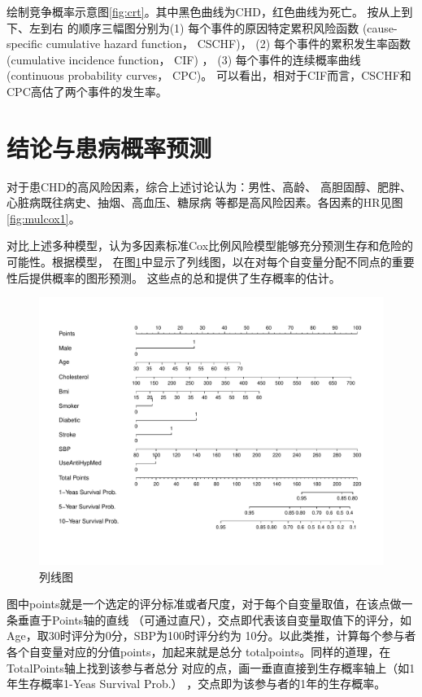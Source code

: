 \documentclass[lang=cn,11pt,a4paper,cite=super,AutoFakeBold]{elegantpaper}
\begin{document}
绘制竞争概率示意图\ref{fig:crt}。其中黑色曲线为CHD，红色曲线为死亡。 按从上到下、左到右
的顺序三幅图分别为(1) 每个事件的原因特定累积风险函数 
(cause-specific cumulative hazard function， CSCHF)， (2) 每个事件的累积发生率函数
(cumulative incidence function， CIF) ， 
(3) 每个事件的连续概率曲线 (continuous probability curves， CPC)。
可以看出，相对于CIF而言，CSCHF和CPC高估了两个事件的发生率。


\section{结论与患病概率预测}
对于患CHD的高风险因素，综合上述讨论认为：男性、高龄、
高胆固醇、肥胖、心脏病既往病史、抽烟、高血压、糖尿病
等都是高风险因素。各因素的HR见图\ref{fig:mulcox1}。

对比上述多种模型，认为多因素标准Cox比例风险模型能够充分预测生存和危险的可能性。根据模型，
在图\ref{fig:nom}中显示了列线图，以在对每个自变量分配不同点的重要性后提供概率的图形预测。
这些点的总和提供了生存概率的估计。
\begin{figure}[!htb]
   \centering
   \includegraphics[width=\linewidth]{img/nom.pdf}
   \caption{列线图}
   \label{fig:nom}
\end{figure}

图中points就是一个选定的评分标准或者尺度，对于每个自变量取值，在该点做一条垂直于Points轴的直线
（可通过直尺），交点即代表该自变量取值下的评分，如Age，取30时评分为0分，SBP为100时评分约为
10分。以此类推，计算每个参与者各个自变量对应的分值points，加起来就是总分
totalpoints。同样的道理，在TotalPoints轴上找到该参与者总分
对应的点，画一垂直直接到生存概率轴上（如1年生存概率1-Yeas Survival Prob.）
，交点即为该参与者的1年的生存概率。
\end{document}
